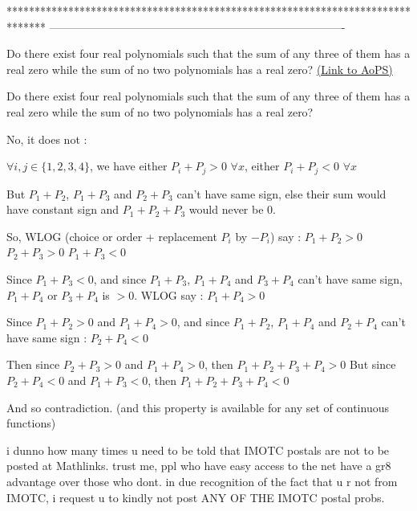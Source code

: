 *******************************************************************************
-------------------------------------------------------------------------------

\begin{problem}
	Do there exist four real polynomials such that the sum of any three of them has a real zero while the sum of no two polynomials has a real zero?
	\flushright \href{https://artofproblemsolving.com/community/c6h166926}{(Link to AoPS)}
\end{problem}



\begin{mysolution}
	\begin{tcolorbox}Do there exist four real polynomials such that the sum of any three of them has a real zero while the sum of no two polynomials has a real zero?\end{tcolorbox}

No, it does not :

$ \forall i,j\in\{1,2,3,4\}$, we have either $ P_{i}+P_{j}> 0$ $ \forall x$, either $ P_{i}+P_{j}< 0$ $ \forall x$

But $ P_{1}+P_{2}$, $ P_{1}+P_{3}$ and $ P_{2}+P_{3}$ can't have same sign, else their sum would have constant sign and $ P_{1}+P_{2}+P_{3}$ would never be 0.

So, WLOG (choice or order + replacement $ P_{i}$ by $ -P_{i}$) say :
$ P_{1}+P_{2}> 0$
$ P_{2}+P_{3}> 0$
$ P_{1}+P_{3}< 0$

Since $ P_{1}+P_{3}< 0$, and since $ P_{1}+P_{3}$, $ P_{1}+P_{4}$ and $ P_{3}+P_{4}$ can't have same sign, $ P_{1}+P_{4}$ or $ P_{3}+P_{4}$ is $ > 0$. WLOG say :
$ P_{1}+P_{4}> 0$

Since $ P_{1}+P_{2}> 0$ and $ P_{1}+P_{4}> 0$, and since $ P_{1}+P_{2}$, $ P_{1}+P_{4}$ and $ P_{2}+P_{4}$ can't have same sign :
$ P_{2}+P_{4}< 0$

Then since $ P_{2}+P_{3}> 0$ and $ P_{1}+P_{4}> 0$, then $ P_{1}+P_{2}+P_{3}+P_{4}> 0$
But since $ P_{2}+P_{4}< 0$ and $ P_{1}+P_{3}< 0$, then $ P_{1}+P_{2}+P_{3}+P_{4}< 0$

And so contradiction.
(and this property is available for any set of continuous functions)
\end{mysolution}



\begin{mysolution}
	i dunno how many times u need to be told that IMOTC postals are not to be posted at Mathlinks.
trust me, ppl who have easy access to the net have a gr8 advantage over those who dont.
in due recognition of the fact that u r not from IMOTC, i request u to kindly not post ANY OF THE IMOTC postal probs.
\end{mysolution}



